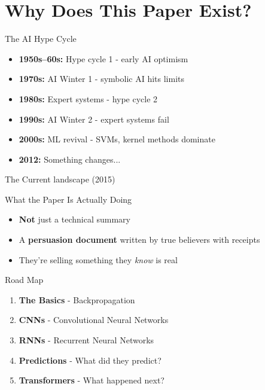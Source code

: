 \section{Why Does This Paper Exist?}

\begin{frame}{The AI Hype Cycle}
    \begin{itemize}
        \item \textbf{1950s--60s:} Hype cycle 1 - early AI optimism
        \item \textbf{1970s:} AI Winter 1 - symbolic AI hits limits
        \item \textbf{1980s:} Expert systems - hype cycle 2
        \item \textbf{1990s:} AI Winter 2 - expert systems fail
        \item \textbf{2000s:} ML revival - SVMs, kernel methods dominate
        \item \textbf{2012:} Something changes...
    \end{itemize}
\end{frame}

\begin{frame}{The Current landscape (2015)}
    
    \vspace{1em}
    \begin{quote}
    \end{quote}
    
    \vspace{1em}
\end{frame}

\begin{frame}{What the Paper Is Actually Doing}
    \begin{itemize}
        \item \textbf{Not} just a technical summary
        \item A \textbf{persuasion document} written by true believers with receipts
        \item They're selling something they \textit{know} is real
    \end{itemize}
    
    \vspace{1em}
\end{frame}

\begin{frame}{Road Map}
    \begin{enumerate}
        \item \textbf{The Basics} - Backpropagation
        \item \textbf{CNNs} - Convolutional Neural Networks
        \item \textbf{RNNs} - Recurrent Neural Networks
        \item \textbf{Predictions} - What did they predict?
        \item \textbf{Transformers} - What happened next?
    \end{enumerate}
\end{frame}
